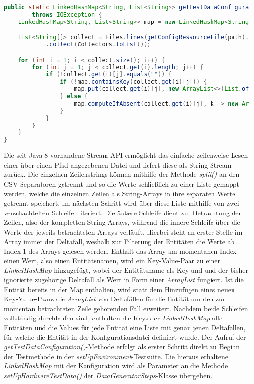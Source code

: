 \begin{lstlisting}[caption=Methode zum Parsen und Mappen der Testdatenkonfiguration, label=testdataParse,language=Java]
public static LinkedHashMap<String, List<String>> getTestDataConfiguration(String path)
		throws IOException {
	LinkedHashMap<String, List<String>> map = new LinkedHashMap<String, List<String>>();

	List<String[]> collect = Files.lines(getConfigRessourceFile(path).toPath()).map(line -> line.split(",|;"))
			.collect(Collectors.toList());

	for (int i = 1; i < collect.size(); i++) {
		for (int j = 1; j < collect.get(i).length; j++) {
			if (!collect.get(i)[j].equals("")) {
				if (!map.containsKey(collect.get(i)[j])) {
					map.put(collect.get(i)[j], new ArrayList<>(List.of(collect.get(i)[0])));
				} else {
					map.computeIfAbsent(collect.get(i)[j], k -> new ArrayList<String>()).add(collect.get(i)[0]);
				}
			}
		}
	}
}
\end{lstlisting}

Die seit Java 8 vorhandene Stream-\ac{API} ermöglicht das einfache zeilenweise Lesen einer über einen Pfad angegebenen Datei und liefert diese als String-Stream zurück. Die einzelnen Zeilenstrings können mithilfe der Methode \textit{split()} an den \ac{CSV}-Separatoren getrennt und so die Werte schließlich zu einer Liste gemappt werden, welche die einzelnen Zeilen als String-Arrays in ihre separaten Werte getrennt speichert. Im nächsten Schritt wird über diese Liste mithilfe von zwei verschachtelten Schleifen iteriert. Die äußere Schleife dient zur Betrachtung der Zeilen, also der kompletten String-Arrays, während die innere Schleife über die Werte der jeweils betrachteten Arrays verläuft. Hierbei steht an erster Stelle im Array immer der Deltafall, weshalb zur Filterung der Entitäten die Werte ab Index 1 des Arrays gelesen werden. Enthält das Array am momentanen Index einen Wert, also einen Entitätsnamen, wird ein Key-Value-Paar zu einer \textit{LinkedHashMap} hinzugefügt, wobei der Entitätsname als Key und und der bisher ignorierte zugehörige Deltafall als Wert in Form einer \textit{ArrayList} fungiert. Ist die Entität bereits in der Map enthalten, wird statt dem Hinzufügen eines neuen Key-Value-Paars die \textit{ArrayList} von Deltafällen für die Entität um den zur momentan betrachteten Zeile gehörenden Fall erweitert. Nachdem beide Schleifen vollständig durchlaufen sind, enthalten die Keys der \textit{LinkedHashMap} alle Entitäten und die Values für jede Entität eine Liste mit genau jenen Deltafällen, für welche die Entität in der Konfigurationsdatei definiert wurde. Der Aufruf der \textit{getTestDataConfiguration()}-Methode erfolgt als erster Schritt direkt zu Beginn der Testmethode in der \textit{setUpEnvironment}-Testsuite. Die hieraus erhaltene \textit{LinkedHashMap} mit der Konfiguration wird als Parameter an die Methode \textit{setUpHardwareTestData()} der \textit{DataGeneratorSteps}-Klasse übergeben.


